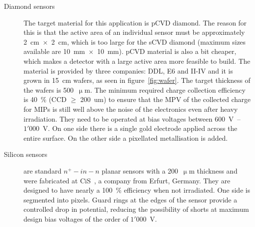 \begin{description}
\item[Diamond sensors] The target material for this application is pCVD diamond. The reason for this is that the active area of an individual sensor must be approximately 2~cm~$\times$~2~cm, which is too large for the sCVD diamond (maximum sizes available are 10~mm~$\times$~10~mm). pCVD material is also a bit cheaper, which makes a detector with a large active area more feasible to build. The material is provided by three companies: DDL, E6 and II-IV and it is grown in 15~cm wafers, as seen in figure~\ref{fig:wafer}. The target thickness of the wafers is 500~$\upmu$m. The minimum required charge collection efficiency is 40~\% (CCD $\geq$ 200~um) to ensure that the MPV of the collected charge for MIPs is still well above the noise of the electronics even after heavy irradiation. They need to be operated at bias voltages between 600~V~--~$1'000$~V. On one side there is a single gold electrode applied across the entire surface. On the other side a pixellated metallisation is added. 
\item[Silicon sensors] are standard $n^+ - in - n$ planar sensors with a 200~$\upmu$m thickness and were fabricated at CiS~\cite{CIS:00000}, a company from Erfurt, Germany. They are designed to have nearly a 100~\% efficiency when not irradiated. 
One side is segmented into pixels. Guard rings at the edges of the sensor provide a controlled drop in potential, reducing the possibility of shorts at maximum design bias voltages of the order of $1'000$~V.
\end{description}



